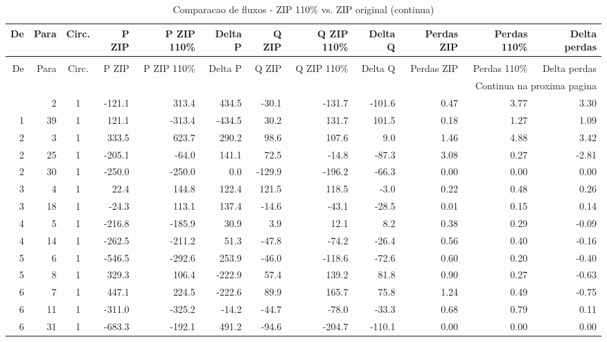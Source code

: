\documentclass[12pt]{classe_uftex/uftex}
\begin{document}
\begin{landscape}
\tiny
\begin{longtable}{rrcrrrrrrrrr}
\caption{Comparacao de fluxos - ZIP 110\% vs. ZIP original}\label{tab:fluxos-zip110-zip}\\
\toprule
De & Para & Circ. & P ZIP & P ZIP 110\% & Delta P & Q ZIP & Q ZIP 110\% & Delta Q & Perdas ZIP & Perdas 110\% & Delta perdas \\
\midrule
\endfirsthead
\caption[]{Comparacao de fluxos - ZIP 110\% vs. ZIP original (continua)}\\
\toprule
De & Para & Circ. & P ZIP & P ZIP 110\% & Delta P & Q ZIP & Q ZIP 110\% & Delta Q & Perdas ZIP & Perdas 110\% & Delta perdas \\
\midrule
\endhead
\midrule
\multicolumn{12}{r}{Continua na proxima pagina}\\
\endfoot
\bottomrule
\endlastfoot
1 & 2 & 1 & -121.1 & 313.4 & 434.5 & -30.1 & -131.7 & -101.6 & 0.47 & 3.77 & 3.30 \\
1 & 39 & 1 & 121.1 & -313.4 & -434.5 & 30.2 & 131.7 & 101.5 & 0.18 & 1.27 & 1.09 \\
2 & 3 & 1 & 333.5 & 623.7 & 290.2 & 98.6 & 107.6 & 9.0 & 1.46 & 4.88 & 3.42 \\
2 & 25 & 1 & -205.1 & -64.0 & 141.1 & 72.5 & -14.8 & -87.3 & 3.08 & 0.27 & -2.81 \\
2 & 30 & 1 & -250.0 & -250.0 & 0.0 & -129.9 & -196.2 & -66.3 & 0.00 & 0.00 & 0.00 \\
3 & 4 & 1 & 22.4 & 144.8 & 122.4 & 121.5 & 118.5 & -3.0 & 0.22 & 0.48 & 0.26 \\
3 & 18 & 1 & -24.3 & 113.1 & 137.4 & -14.6 & -43.1 & -28.5 & 0.01 & 0.15 & 0.14 \\
4 & 5 & 1 & -216.8 & -185.9 & 30.9 & 3.9 & 12.1 & 8.2 & 0.38 & 0.29 & -0.09 \\
4 & 14 & 1 & -262.5 & -211.2 & 51.3 & -47.8 & -74.2 & -26.4 & 0.56 & 0.40 & -0.16 \\
5 & 6 & 1 & -546.5 & -292.6 & 253.9 & -46.0 & -118.6 & -72.6 & 0.60 & 0.20 & -0.40 \\
5 & 8 & 1 & 329.3 & 106.4 & -222.9 & 57.4 & 139.2 & 81.8 & 0.90 & 0.27 & -0.63 \\
6 & 7 & 1 & 447.1 & 224.5 & -222.6 & 89.9 & 165.7 & 75.8 & 1.24 & 0.49 & -0.75 \\
6 & 11 & 1 & -311.0 & -325.2 & -14.2 & -44.7 & -78.0 & -33.3 & 0.68 & 0.79 & 0.11 \\
6 & 31 & 1 & -683.3 & -192.1 & 491.2 & -94.6 & -204.7 & -110.1 & 0.00 & 0.00 & 0.00 \\

\end{longtable}
\end{landscape}
\end{document}
